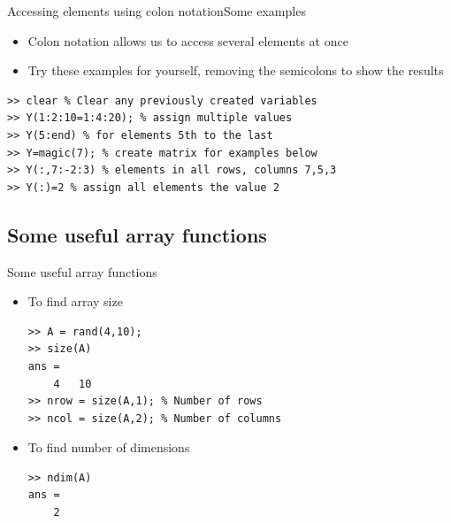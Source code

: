 \documentclass{beamer}
\begin{document}
\begin{frame}[fragile]{Accessing elements using colon notation}{Some examples}
	\begin{itemize}
		\item Colon notation allows us to access several elements at once 
		\item Try these examples for yourself, removing the semicolons to show the results
	\end{itemize}
	
	\begin{lstlisting}[style=Matlab-editor,basicstyle=\footnotesize]
>> clear % Clear any previously created variables
>> Y(1:2:10=1:4:20); % assign multiple values
>> Y(5:end) % for elements 5th to the last
>> Y=magic(7); % create matrix for examples below
>> Y(:,7:-2:3) % elements in all rows, columns 7,5,3
>> Y(:)=2 % assign all elements the value 2
	\end{lstlisting}
\end{frame}

\subsection{Some useful array functions}
\begin{frame}[fragile]{Some useful array functions}
	\begin{itemize}
		\item To find array size
		
		\begin{lstlisting}[style=Matlab-editor]
>> A = rand(4,10);
>> size(A)
ans = 
	4	10
>> nrow = size(A,1); % Number of rows
>> ncol = size(A,2); % Number of columns
		\end{lstlisting}
		\item To find number of dimensions
		
		\begin{lstlisting}[style=Matlab-editor]
>> ndim(A)
ans = 
	2
		\end{lstlisting}
	\end{itemize}
\end{frame}
\end{document}
